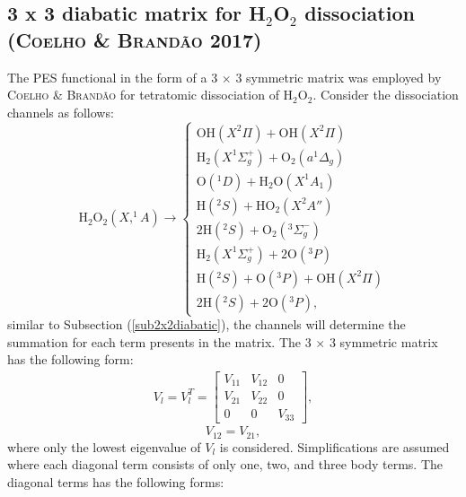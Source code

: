 \documentclass[12pt]{article}
\begin{document}
\subsection{3 x 3 diabatic matrix for H$_2$O$_2$ dissociation (\textsc{Coelho \& Brandão} 2017)}
\label{sub3x3matrix}
The PES functional in the form of a 3 $\times$ 3 symmetric matrix was employed by \textsc{Coelho \& Brandão} \cite{idx147} for tetratomic dissociation of H$_2$O$_2$. Consider the dissociation channels as follows:
\begin{equation}
    \text{H}_2\text{O}_2(X,^1A) \rightarrow
    \begin{cases}
        \text{OH}(X^2\Pi) + \text{OH}(X^2\Pi) \\
        \text{H}_2(X^1\Sigma_g^+)+\text{O}_2(a^1\Delta_g) \\
        \text{O}(^1D) + \text{H}_2\text{O}(X^1A_1)\\
        \text{H}(^2S)+\text{HO}_2(X^2A'')\\
        2\text{H}(^2S)+\text{O}_2(^3\Sigma_g^-)\\
        \text{H}_2(X^1\Sigma_g^+)+2\text{O}(^3P)\\
        \text{H}(^2S)+\text{O}(^3P)+\text{OH}(X^2\Pi)\\
        2\text{H}(^2S)+2\text{O}(^3P),
    \end{cases}
    \label{eq3x3dissociation}
\end{equation}
similar to Subsection (\ref{sub2x2diabatic}), the channels will determine the summation for each term presents in the matrix. The 3 $\times$ 3 symmetric matrix has the following form:
\begin{equation}
    \begin{split}
        V_l = V_l^T =
        \begin{bmatrix}
            V_{11} & V_{12} &
            0 \\
            V_{21} &
            V_{22} &
            0 \\
            0 &
            0 &
            V_{33}
        \end{bmatrix}
        ,
        \label{eq3x3matrix}
    \end{split}
\end{equation}
\begin{equation}
    V_{12} = V_{21},
\end{equation}
where only the lowest eigenvalue of $V_l$ is considered. Simplifications are assumed where each diagonal term consists of only one, two, and three body terms. The diagonal terms has the following forms:
\end{document}
